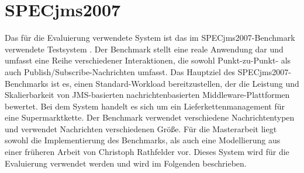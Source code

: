 
\section{SPECjms2007}
\label{sec:specjms}
Das für die Evaluierung verwendete System ist das im SPECjms2007-Benchmark verwendete Testsystem \cite{Sachs2013}. Der Benchmark stellt eine reale Anwendung dar und umfasst eine Reihe verschiedener Interaktionen, die sowohl Punkt-zu-Punkt- als auch Publish/Subscribe-Nachrichten umfasst. Das Hauptziel des SPECjms2007-Benchmarks ist es, einen Standard-Workload bereitzustellen, der die Leistung und Skalierbarkeit von JMS-basierten nachrichtenbasierten Middleware-Plattformen bewertet. Bei dem System handelt es sich um ein Lieferkettenmanagement für eine Supermarktkette. Der Benchmark verwendet verschiedene Nachrichtentypen und verwendet Nachrichten verschiedenen Größe. Für die Masterarbeit liegt sowohl die Implementierung des Benchmarks, als auch eine Modellierung aus einer früheren Arbeit von Christoph Rathfelder \cite{Rathfelder2013} vor. Dieses System wird für die Evaluierung verwendet werden und wird im Folgenden beschrieben. 

